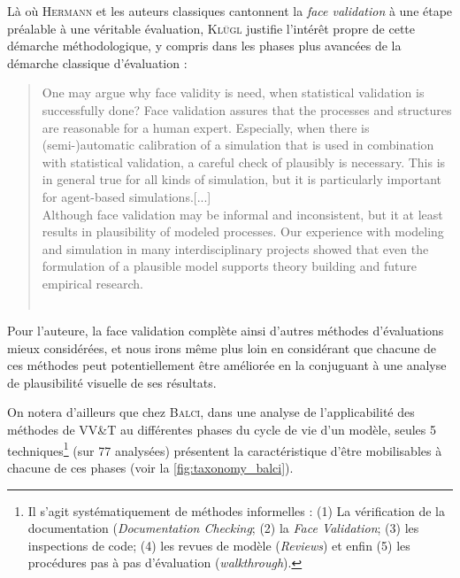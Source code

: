 Là où H\textsc{ermann} et les auteurs classiques cantonnent la \textit{face validation} à une étape préalable à une véritable évaluation, K\textsc{lügl} justifie l'intérêt propre de cette démarche méthodologique, y compris dans les phases plus avancées de la démarche classique d'évaluation :

\begin{quotation}
	\og One may argue why face validity is need, when statistical validation is successfully done? Face validation assures that the processes and structures are reasonable for a human expert. Especially, when there is (semi-)automatic calibration of a simulation that is used in combination with statistical validation, a careful check of plausibly is necessary. This is in general true for all kinds of simulation, but it is particularly important for agent-based simulations.[...]\\
	
	Although face validation may be informal and inconsistent, but it at least results in plausibility of modeled processes. Our experience with modeling and simulation in many interdisciplinary projects showed that even the formulation of a plausible model supports theory building and future empirical research.\fg{}\\
	\mbox{}~ \hfill \cite[40;43]{klugl_validation_2008}
\end{quotation}


Pour l'auteure, la face validation complète ainsi d'autres méthodes d'évaluations mieux considérées, et nous irons même plus loin en considérant que chacune de ces méthodes peut potentiellement être améliorée en la conjuguant à une analyse de plausibilité visuelle de ses résultats.

On notera d'ailleurs que chez B\textsc{alci}, dans une analyse de l'applicabilité des méthodes de \og VV\&T\fg{} au différentes phases du cycle de vie d'un modèle, seules 5 techniques\footnote{
	Il s'agit systématiquement de méthodes \og informelles\fg{} : 
	(1) La vérification de la documentation (\textit{Documentation Checking}; (2) la \textit{Face Validation}; (3) les inspections de code; (4) les \og revues\fg{} de modèle (\textit{Reviews}) et enfin (5) les \og procédures pas à pas\fg{} d'évaluation (\textit{walkthrough}).
} (sur 77 analysées) présentent la caractéristique d'être mobilisables à chacune de ces phases (voir la \autoref{fig:taxonomy_balci}).


